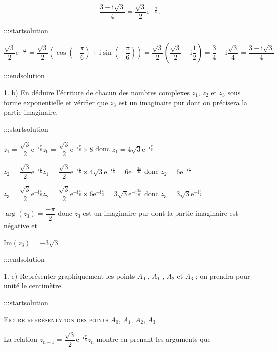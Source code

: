 \documentclass{cornouaille}
\begin{document}
$$
\dfrac{3 - \text{i}\sqrt{3}}{4} = \dfrac{\sqrt{3}}{2}\text{e}^{- \text{i}\frac{\pi}{6}}.
$$



:::startsolution

$\dfrac{\sqrt{3}}{2} \text{e}^{-\text{i} \frac{\pi}{6}} = \dfrac{\sqrt{3}}{2} \left( \cos\left(-\dfrac{\pi}{6}\right) + \text{i}\sin\left(-\dfrac{\pi}{6}\right) \right) = \dfrac{\sqrt{3}}{2} \left( \dfrac{\sqrt{3}}{2} - \text{i}\dfrac{1}{2} \right) = \dfrac{3}{4} - \text{i} \dfrac{\sqrt{3}}{4} = \dfrac{3-\text{i}\sqrt{3}}{4}$


:::endsolution


1. b)  En déduire l'écriture de chacun des nombres complexes $z_1$,  $z_2$ et $z_3$ sous forme exponentielle et vérifier que $z_3$ est un imaginaire pur dont on précisera la partie imaginaire.


:::startsolution

$z_1=\dfrac{\sqrt{3}}{2} \text{e}^{-\text{i} \frac{\pi}{6}}z_0=\dfrac{\sqrt{3}}{2} \text{e}^{-\text{i} \frac{\pi}{6}} \times 8$ donc $\boxed{ z_1=4\sqrt{3} \text{e}^{-\text{i} \frac{\pi}{6}} }$\smallskip

$z_2=\dfrac{\sqrt{3}}{2} \text{e}^{-\text{i} \frac{\pi}{6}}z_1 = \dfrac{\sqrt{3}}{2} \text{e}^{-\text{i} \frac{\pi}{6}} \times 4\sqrt{3} \text{e}^{-\text{i} \frac{\pi}{6}} = 6 \text{e}^{-\text{i} \frac{2\pi}{6}}$ donc $\boxed{ z_2=6 \text{e}^{-\text{i} \frac{\pi}{3}} }$\smallskip

$z_3=\dfrac{\sqrt{3}}{2} \text{e}^{-\text{i} \frac{\pi}{6}}z_2 = \dfrac{\sqrt{3}}{2} \text{e}^{-\text{i} \frac{\pi}{6}} \times 6 \text{e}^{-\text{i} \frac{\pi}{3}} = 3\sqrt{3} \text{e}^{-\text{i} \frac{3\pi}{6}}$ donc $\boxed{ z_3=3\sqrt{3} \text{e}^{-\text{i} \frac{\pi}{2}} }$\medskip

$\arg(z_3) = \dfrac{-\pi}{2}$ donc $z_3$ est un imaginaire pur dont la partie imaginaire est négative et

$\boxed{ \text{Im}\left(z_3\right) = - 3\sqrt{3} }$


:::endsolution


1. c)  Représenter graphiquement les points $A_0$ , $A_1$ , $A_2$ et $A_3$ ; on prendra pour unité le centimètre.


:::startsolution

\textsc{Figure représentation des points $A_0$, \:$A_1$, \:$A_2$, \:$A_3$}

La relation $z_{n+1} = \dfrac{\sqrt{3}}{2}\text{e}^{- \text{i}\frac{\pi}{6}}z_n$ montre en prenant les arguments que
\end{document}
